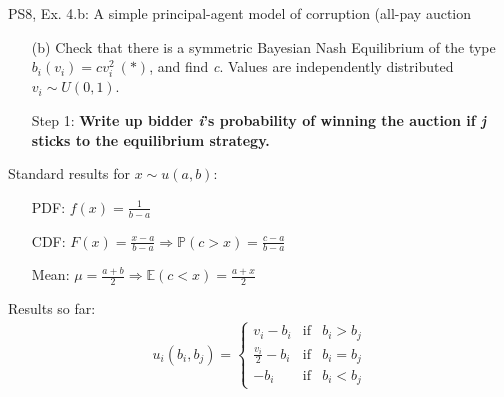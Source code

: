 \begin{frame}{PS8, Ex. 4.b: A simple principal-agent model of corruption (all-pay auction}
    \begin{itemize}
      \item[(b)] Check that there is a symmetric Bayesian Nash Equilibrium of the type $b_i(v_i) = cv_i^2\ (*)$, and find \textit{c}. Values are independently distributed $v_i\sim U(0, 1)$.
    \end{itemize} \vspace{-8pt}
    \begin{multicols}{2}
      \begin{itemize}
        \item[Step 1:] \textbf{Write up bidder \textit{i}'s probability of winning the auction if \textit{j} sticks to the equilibrium strategy.}
      \end{itemize}
      \vfill\null\columnbreak
      Standard results for $x\sim u(a, b):$ \vspace{-6pt}
      \begin{itemize}
        \item[PDF:] $f(x)=\frac{1}{b-a}$
        \item[CDF:] $F(x)=\frac{x-a}{b-a}\Rightarrow\mathbb{P}(c>x)=\frac{c-a}{b-a}$
        \item[Mean:] $\mu=\frac{a+b}{2}\Rightarrow\mathbb{E}(c<x)=\frac{a+x}{2}$
      \end{itemize}
      \vspace{-6pt}
      Results so far: \vspace{-6pt}
      \begin{align*}
        u_i(b_i,b_j)=\left\{\begin{array}{lcl}
          v_i-b_i           & \text{if} & b_i>b_j \\
          \frac{v_i}{2}-b_i & \text{if} & b_i=b_j \\
          -b_i              & \text{if} & b_i<b_j
        \end{array}\right.
      \end{align*}
      \vfill\null
    \end{multicols}
\end{frame}

